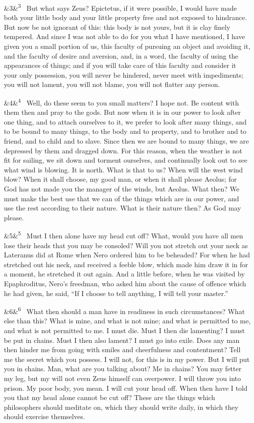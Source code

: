 \documentclass[12pt]{article}
\newcommand{\para}[1][]{\par\noindent\ifx&#1&\else\textsuperscript{\footnotesize #1}~\fi}
\begin{document}
\para[3] But what says Zeus? Epictetus, if it were possible, I would have made both your little body and your little property free and not exposed to hindrance. But now be not ignorant of this: this body is not yours, but it is clay finely tempered. And since I was not able to do for you what I have mentioned, I have given you a small portion of us, this faculty of pursuing an object and avoiding it, and the faculty of desire and aversion, and, in a word, the faculty of using the appearances of things; and if you will take care of this faculty and consider it your only possession, you will never be hindered, never meet with impediments; you will not lament, you will not blame, you will not flatter any person.

\para[4] Well, do these seem to you small matters? I hope not. Be content with them then and pray to the gods. But now when it is in our power to look after one thing, and to attach ourselves to it, we prefer to look after many things, and to be bound to many things, to the body and to property, and to brother and to friend, and to child and to slave. Since then we are bound to many things, we are depressed by them and dragged down. For this reason, when the weather is not fit for sailing, we sit down and torment ourselves, and continually look out to see what wind is blowing. It is north. What is that to us? When will the west wind blow? When it shall choose, my good man, or when it shall please Aeolus; for God has not made you the manager of the winds, but Aeolus. What then? We must make the best use that we can of the things which are in our power, and use the rest according to their nature. What is their nature then? As God may please.

\para[5] Must I then alone have my head cut off? What, would you have all men lose their heads that you may be consoled? Will you not stretch out your neck as Lateranus did at Rome when Nero ordered him to be beheaded? For when he had stretched out his neck, and received a feeble blow, which made him draw it in for a moment, he stretched it out again. And a little before, when he was visited by Epaphroditus, Nero's freedman, who asked him about the cause of offence which he had given, he said, “If I choose to tell anything, I will tell your master.”

\para[6] What then should a man have in readiness in such circumstances? What else than this? What is mine, and what is not mine; and what is permitted to me, and what is not permitted to me. I must die. Must I then die lamenting? I must be put in chains. Must I then also lament? I must go into exile. Does any man then hinder me from going with smiles and cheerfulness and contentment? Tell me the secret which you possess. I will not, for this is in my power. But I will put you in chains. Man, what are you talking about? Me in chains? You may fetter my leg, but my will not even Zeus himself can overpower. I will throw you into prison. My poor body, you mean. I will cut your head off. When then have I told you that my head alone cannot be cut off? These are the things which philosophers should meditate on, which they should write daily, in which they should exercise themselves.
\end{document}
